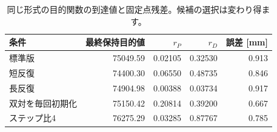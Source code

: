 \begin{table}[H]\centering
\small
\setlength{\tabcolsep}{4pt}
\caption{同じ形式の目的関数の到達値と固定点残差。候補の選択は変わり得ます。}
\begin{tabular}{lrrrr}
\toprule
条件 & 最終保持目的値 & $r_P$ & $r_D$ & 誤差 [mm]\\\midrule
標準版 & 75049.59 & 0.02105 & 0.32530 & 0.913\\
短反復 & 74400.30 & 0.06550 & 0.48735 & 0.846\\
長反復 & 74904.98 & 0.00388 & 0.03734 & 0.917\\
双対を毎回初期化 & 75150.42 & 0.20814 & 0.39200 & 0.667\\
ステップ比4 & 76275.29 & 0.03285 & 0.87767 & 0.785\\
\bottomrule
\end{tabular}
\end{table}
